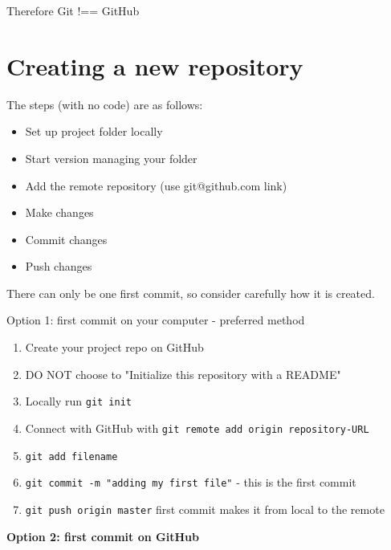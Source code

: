 Therefore Git !== GitHub 
\\




\section{Creating a new repository}

The steps (with no code) are as follows:

\begin{itemize}
    \item Set up project folder locally
    \item Start version managing your folder
    \item Add the remote repository (use git@github.com link)
    \item Make changes
    \item Commit changes
    \item Push changes
\end{itemize}

There can only be one first commit, so consider carefully how it is created.
\\

\begin{infobox}{Option 1: first commit on your computer - preferred method}

	\begin{enumerate}
		\item Create your project repo on GitHub
		\item DO NOT choose to "Initialize this repository with a README"
		\item Locally run \texttt{git init}
		\item Connect with GitHub with \texttt{git remote add origin {repository-URL}}
		\item \texttt{git add {filename}}
		\item \texttt{git commit -m "adding my first file"} - this is the first commit
		\item \texttt{git push origin master} first commit makes it from local to the remote
	\end{enumerate}
\end{infobox}

\textbf{Option 2: first commit on GitHub}

